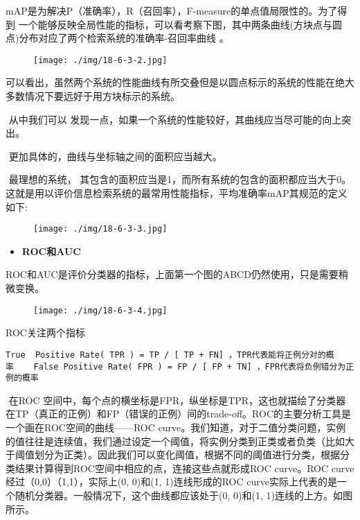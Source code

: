 ​
mAP是为解决P（准确率），R（召回率），F-measure的单点值局限性的。为了得到
一个能够反映全局性能的指标，可以看考察下图，其中两条曲线(方块点与圆点)分布对应了两个检索系统的准确率-召回率曲线
。

\begin{figure}
\centering
\texttt{[image: ./img/18-6-3-2.jpg]}
\caption{}
\end{figure}

​
可以看出，虽然两个系统的性能曲线有所交叠但是以圆点标示的系统的性能在绝大多数情况下要远好于用方块标示的系统。

​ 从中我们可以
发现一点，如果一个系统的性能较好，其曲线应当尽可能的向上突出。

​ 更加具体的，曲线与坐标轴之间的面积应当越大。

​ 最理想的系统，
其包含的面积应当是1，而所有系统的包含的面积都应当大于0。这就是用以评价信息检索系统的最常用性能指标，平均准确率mAP其规范的定义如下:

\begin{figure}
\centering
\texttt{[image: ./img/18-6-3-3.jpg]}
\caption{}
\end{figure}

\begin{itemize}
\item
  \textbf{ROC和AUC}
\end{itemize}

​
ROC和AUC是评价分类器的指标，上面第一个图的ABCD仍然使用，只是需要稍微变换。

\begin{figure}
\centering
\texttt{[image: ./img/18-6-3-4.jpg]}
\caption{}
\end{figure}

ROC关注两个指标

\texttt{True\ \ Positive\ Rate(\ TPR\ )\ =\ TP\ /\ {[}\ TP\ +\ FN{]}\ ，TPR代表能将正例分对的概率\ \ \ \ False\ Positive\ Rate(\ FPR\ )\ =\ FP\ /\ {[}\ FP\ +\ TN{]}\ ，FPR代表将负例错分为正例的概率}

​ 在ROC
空间中，每个点的横坐标是FPR，纵坐标是TPR，这也就描绘了分类器在TP（真正的正例）和FP（错误的正例）间的trade-off。ROC的主要分析工具是一个画在ROC空间的曲线------ROC
curve。我们知道，对于二值分类问题，实例的值往往是连续值，我们通过设定一个阈值，将实例分类到正类或者负类（比如大于阈值划分为正类）。因此我们可以变化阈值，根据不同的阈值进行分类，根据分类结果计算得到ROC空间中相应的点，连接这些点就形成ROC
curve。ROC curve经过（0,0）（1,1），实际上(0, 0)和(1, 1)连线形成的ROC
curve实际上代表的是一个随机分类器。一般情况下，这个曲线都应该处于(0,
0)和(1, 1)连线的上方。如图所示。

